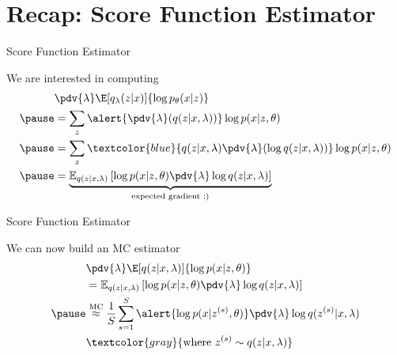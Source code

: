 \section{Recap: Score Function Estimator}

\frame{\tableofcontents[currentsection]}

\begin{frame}{Score Function Estimator}

We are interested in computing
\vspace{-5pt}
\begin{equation*}
\begin{aligned}
&\pdv{\lambda}\E[q_\lambda(z|x)]{\log p_\theta(x|z)} \\  \pause
&=  \sum_z \alert{\pdv{\lambda}(q(z|x, \lambda))} \log p(x|z, \theta) \\  \pause
&= \sum_z \textcolor{blue}{q(z|x, \lambda) \pdv{\lambda}(\log q(z|x, \lambda))} \log p(x|z, \theta)  \\ \pause
&= \underbrace{\mathbb E_{q(z|x, \lambda)} \left[  \log p(x|z, \theta)  \pdv{\lambda}\log q(z|x, \lambda)\right]}_{\text{expected gradient :)}}
\end{aligned}
\end{equation*}


\end{frame}

\begin{frame}{Score Function Estimator}

We can now build an MC estimator
\begin{equation*}
\begin{aligned}
&\pdv{\lambda}\E[q(z|x,\lambda)]{\log p(x|z,\theta)} \\ 
&= \mathbb E_{q(z|x,\lambda)} \left[  \log p(x|z,\theta)  \pdv{\lambda}\log q(z|x,\lambda)\right] \\ \pause 
&\overset{\text{MC}}{\approx} \frac{1}{S} \sum_{s=1}^S \alert{\log p(x|z^{(s)}, \theta)} \pdv{\lambda}\log q(z^{(s)}|x, \lambda) \\
&\textcolor{gray}{\text{where } z^{(s)} \sim q(z|x, \lambda)}
\end{aligned}
\end{equation*}
\end{frame}


